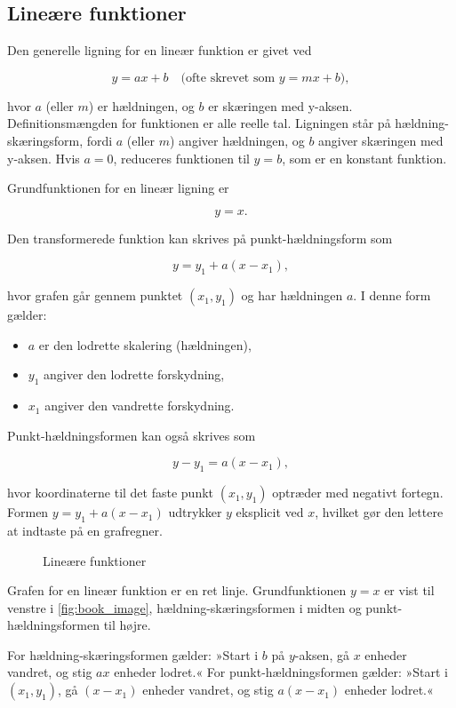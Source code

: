 \subsection*{Lineære funktioner}
Den generelle ligning for en lineær funktion er givet ved

\[
y = ax + b \quad \text{(ofte skrevet som } y = mx + b\text{)},
\]

hvor \(a\) (eller \(m\)) er hældningen, og \(b\) er skæringen med y-aksen. Definitionsmængden for funktionen er alle reelle tal. Ligningen står på hældning-skæringsform, fordi \(a\) (eller \(m\)) angiver hældningen, og \(b\) angiver skæringen med y-aksen. Hvis \(a = 0\), reduceres funktionen til \(y = b\), som er en konstant funktion.

Grundfunktionen for en lineær ligning er

\[
y = x.
\]

Den transformerede funktion kan skrives på punkt-hældningsform som

\[
y = y_1 + a(x - x_1),
\]

hvor grafen går gennem punktet \((x_1, y_1)\) og har hældningen \(a\). I denne form gælder:
\begin{itemize}
    \item \(a\) er den lodrette skalering (hældningen),
    \item \(y_1\) angiver den lodrette forskydning,
    \item \(x_1\) angiver den vandrette forskydning.
\end{itemize}

Punkt-hældningsformen kan også skrives som

\[
y - y_1 = a(x - x_1),
\]

hvor koordinaterne til det faste punkt \((x_1, y_1)\) optræder med negativt fortegn. Formen \(y = y_1 + a(x - x_1)\) udtrykker \(y\) eksplicit ved \(x\), hvilket gør den lettere at indtaste på en grafregner.

\begin{figure}[htbp]
    \centering
    \resizebox{\textwidth}{!}{\DaLinearPanels}
    \caption{Lineære funktioner}
    \label{fig:book_image}
\end{figure}

Grafen for en lineær funktion er en ret linje. Grundfunktionen \(y = x\) er vist til venstre i \autoref{fig:book_image}, hældning-skæringsformen i midten og punkt-hældningsformen til højre.

For hældning-skæringsformen gælder: »Start i \(b\) på \(y\)-aksen, gå \(x\) enheder vandret, og stig \(ax\) enheder lodret.« For punkt-hældningsformen gælder: »Start i \((x_1, y_1)\), gå \((x - x_1)\) enheder vandret, og stig \(a(x - x_1)\) enheder lodret.«

